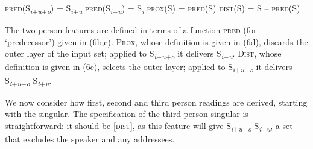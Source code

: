 \documentclass[output=paper]{langsci/langscibook}
\begin{document}
\ea \label{bkm:Ref328731676}\label{bkm:Ref215574498}\label{bkm:Ref229151282} 
\ea
{}
\ex \textsc{pred}(S\textit{\textsubscript{i}}\textsubscript{+}\textit{\textsubscript{u}}\textsubscript{+}\textit{\textsubscript{o}}) = S\textit{\textsubscript{i}}\textsubscript{+}\textit{\textsubscript{u}}
\ex \textsc{pred}(S\textit{\textsubscript{i}}\textsubscript{+}\textit{\textsubscript{u}}) = S\textit{\textsubscript{i}}
\ex \textsc{prox}(S) = \textsc{pred}(S)
\ex \textsc{dist}(S) = S – \textsc{pred}(S)
\z 
\z

The two person features are defined in terms of a function \textsc{pred} (for ‘predecessor’) given in (6b,c). \textsc{Prox}, whose definition is given in (6d), discards the outer layer of the input set; applied to S\textit{\textsubscript{i}}\textsubscript{+}\textit{\textsubscript{u}}\textsubscript{+}\textit{\textsubscript{o}} it delivers S\textit{\textsubscript{i}}\textsubscript{+}\textit{\textsubscript{u}}. \textsc{Dist}, whose definition is given in (6e), selects the outer layer; applied to S\textit{\textsubscript{i}}\textsubscript{+}\textit{\textsubscript{u}}\textsubscript{+}\textit{\textsubscript{o}} it delivers S\textit{\textsubscript{i}}\textsubscript{+}\textit{\textsubscript{u}}\textsubscript{+}\textit{\textsubscript{o}} \textminus{} S\textit{\textsubscript{i}}\textsubscript{+}\textit{\textsubscript{u}}.

We now consider how first, second and third person readings are derived, starting with the singular. The specification of the third person singular is straightforward: it should be [\textsc{dist}], as this feature will give S\textit{\textsubscript{i}}\textsubscript{+}\textit{\textsubscript{u}}\textsubscript{+}\textit{\textsubscript{o}} \textminus{} S\textit{\textsubscript{i}}\textsubscript{+}\textit{\textsubscript{u}}, a set that excludes the speaker and any addressees. 
\end{document}
